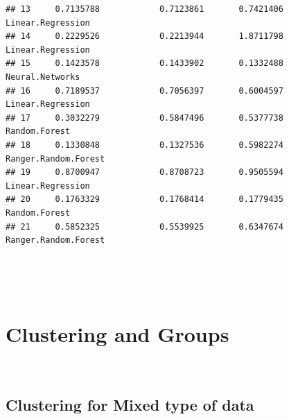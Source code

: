 \documentclass[
]{article}
\begin{document}
\begin{verbatim}
## 13     0.7135788            0.7123861       0.7421406    Linear.Regression
## 14     0.2229526            0.2213944       1.8711798    Linear.Regression
## 15     0.1423578            0.1433902       0.1332488      Neural.Networks
## 16     0.7189537            0.7056397       0.6004597    Linear.Regression
## 17     0.3032279            0.5847496       0.5377738        Random.Forest
## 18     0.1330848            0.1327536       0.5982274 Ranger.Random.Forest
## 19     0.8700947            0.8708723       0.9505594    Linear.Regression
## 20     0.1763329            0.1768414       0.1779435        Random.Forest
## 21     0.5852325            0.5539925       0.6347674 Ranger.Random.Forest
\end{verbatim}

~~

~\\

\hypertarget{clustering-and-groups}{%
\section{Clustering and Groups}\label{clustering-and-groups}}

~\\

\hypertarget{clustering-for-mixed-type-of-data}{%
\subsection{Clustering for Mixed type of
data}\label{clustering-for-mixed-type-of-data}}
\end{document}
